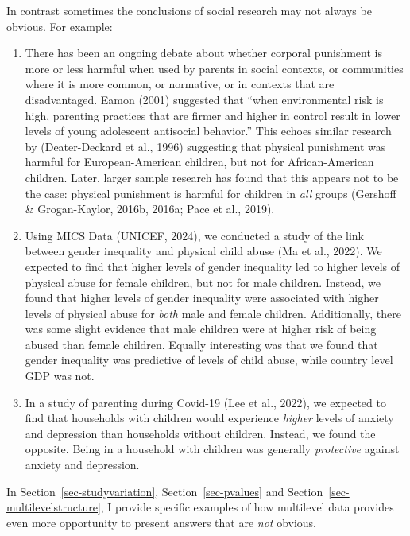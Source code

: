 \documentclass[
  letterpaper,
  DIV=11,
  numbers=noendperiod]{scrreprt}
\providecommand{\tightlist}{%
  \setlength{\itemsep}{0pt}\setlength{\parskip}{0pt}}\usepackage{longtable,booktabs,array}
\begin{document}
In contrast sometimes the conclusions of social research may not always
be obvious. For example:

\begin{enumerate}
\def\labelenumi{\arabic{enumi}.}
\tightlist
\item
  There has been an ongoing debate about whether corporal punishment is
  more or less harmful when used by parents in social contexts, or
  communities where it is more common, or normative, or in contexts that
  are disadvantaged. Eamon (2001) suggested that ``when environmental
  risk is high, parenting practices that are firmer and higher in
  control result in lower levels of young adolescent antisocial
  behavior.'' This echoes similar research by (Deater-Deckard et al.,
  1996) suggesting that physical punishment was harmful for
  European-American children, but not for African-American children.
  Later, larger sample research has found that this appears not to be
  the case: physical punishment is harmful for children in \emph{all}
  groups (Gershoff \& Grogan-Kaylor, 2016b, 2016a; Pace et al., 2019).
\item
  Using MICS Data (UNICEF, 2024), we conducted a study of the link
  between gender inequality and physical child abuse (Ma et al., 2022).
  We expected to find that higher levels of gender inequality led to
  higher levels of physical abuse for female children, but not for male
  children. Instead, we found that higher levels of gender inequality
  were associated with higher levels of physical abuse for \emph{both}
  male and female children. Additionally, there was some slight evidence
  that male children were at higher risk of being abused than female
  children. Equally interesting was that we found that gender inequality
  was predictive of levels of child abuse, while country level GDP was
  not.
\item
  In a study of parenting during Covid-19 (Lee et al., 2022), we
  expected to find that households with children would experience
  \emph{higher} levels of anxiety and depression than households without
  children. Instead, we found the opposite. Being in a household with
  children was generally \emph{protective} against anxiety and
  depression.
\end{enumerate}

In Section~\ref{sec-studyvariation}, Section~\ref{sec-pvalues} and
Section~\ref{sec-multilevelstructure}, I provide specific examples of
how multilevel data provides even more opportunity to present answers
that are \emph{not} obvious.
\end{document}
